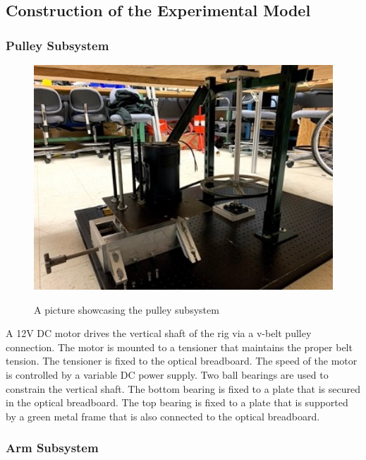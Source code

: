 \subsection{Construction of the Experimental Model}
\subsubsection{Pulley Subsystem}
 
\begin{figure}
    \begin{center}
    \includegraphics[width=5in]{fig5.jpg}
    \end{center}
    \renewcommand{\baselinestretch}{1}
    \small\normalsize
    \begin{quote}
    \caption[A picture showcasing the pulley subsystem]{A picture showcasing the pulley subsystem} \label{fig: f5}
    \end{quote}
\end{figure}

A 12V DC motor drives the vertical shaft of the rig via a v-belt pulley connection. The motor is mounted to 
a tensioner that maintains the proper belt tension. The tensioner is fixed to the optical breadboard. 
The speed of the motor is controlled by a variable DC power supply. Two ball bearings are used to constrain 
the vertical shaft. The bottom bearing is fixed to a plate that is secured in the optical breadboard. 
The top bearing is fixed to a plate that is supported by a green metal frame that is also connected 
to the optical breadboard. 

\subsubsection{Arm Subsystem}

